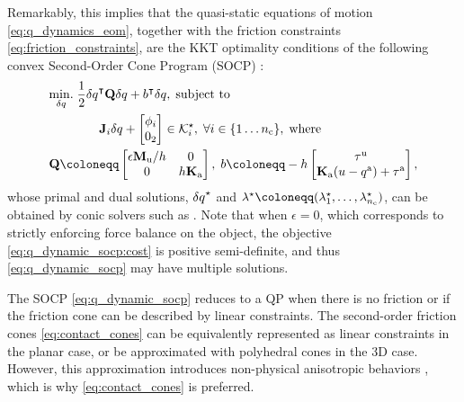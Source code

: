 Remarkably, this implies that the quasi-static equations of motion \eqref{eq:q_dynamics_eom}, together with the friction constraints \eqref{eq:friction_constraints}, are the KKT optimality conditions \cite[]{boyd2004convex} of the following convex Second-Order Cone Program (SOCP) \cite{anitescu2006optimization}:
\begin{subequations}
\label{eq:q_dynamic_socp}
\begin{align}
&\underset{\dq}{\minimize} \; \frac{1}{2} \dq^\intercal \mathbf{Q} \dq + b^\intercal \dq, \; \text{subject to} \label{eq:q_dynamic_socp:cost}\\
&\qquad \qquad \J_i
{\delta q}
+
\begin{bmatrix}
\phi_i \\
0_2
\end{bmatrix}
\in \mathcal{K}_i^\star, \; \forall i \in \{1 \dots \nC\}, \; \text{where} \label{eq:q_dynamic_socp:constraint}\\
&\mathbf{Q} \coloneqq \begin{bmatrix} \epsilon \Mu/h & 0 \\ 0 & h \Ka \end{bmatrix}, \;
b \coloneqq - h\begin{bmatrix} \tauU \\ \Ka(u - \qa) + \tauA \end{bmatrix}, \label{eq:q_dynamic_socp:Q_and_b}
\end{align}
\end{subequations}
whose primal and dual solutions, ${\delta q}^\star$ and $\lambda^\star \coloneqq (\lambda_1^\star, \dots, \lambda_{\nC}^\star)$, can be obtained by conic solvers such as \cite{mosek, scs}. Note that when $\epsilon=0$, which corresponds to strictly enforcing force balance on the object, the objective \eqref{eq:q_dynamic_socp:cost} is positive semi-definite, and thus \eqref{eq:q_dynamic_socp} may have multiple solutions.  

The SOCP \eqref{eq:q_dynamic_socp} reduces to a QP when there is no friction or if the friction cone can be described by linear constraints. The second-order friction cones \eqref{eq:contact_cones} can be equivalently represented as linear constraints in the planar case, or be approximated with polyhedral cones \cite{stewart2000rigid} in the 3D case. However, this approximation introduces non-physical anisotropic behaviors \cite{li2018implicit, howell2022dojo}, which is why \eqref{eq:contact_cones} is preferred.

